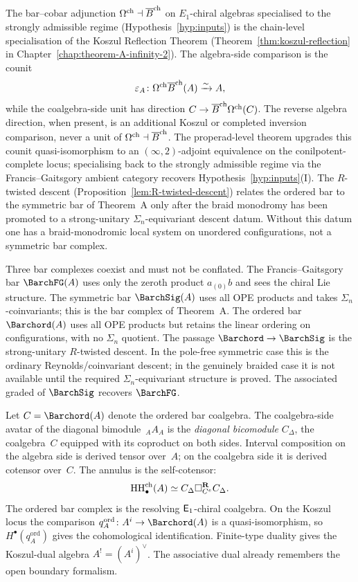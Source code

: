 \begin{remark}
\label{rem:ord-assoc-koszul-reflection-bridge}
The bar--cobar adjunction $\Omega^{\mathrm{ch}} \dashv \overline{B}^{\mathrm{ch}}$ on
$E_1$-chiral algebras specialised to the strongly admissible
regime (Hypothesis~\ref{hyp:inputs}) is the chain-level
specialisation of the Koszul Reflection Theorem
(Theorem~\ref{thm:koszul-reflection} in
Chapter~\ref{chap:theorem-A-infinity-2}). The algebra-side
comparison is the counit
\[
\varepsilon_A\colon \Omega^{\mathrm{ch}}\overline{B}^{\mathrm{ch}}(A)\xrightarrow{\sim} A,
\]
while the coalgebra-side unit has direction
$C\to \overline{B}^{\mathrm{ch}}\Omega^{\mathrm{ch}}(C)$. The reverse algebra direction, when present,
is an additional Koszul or completed inversion comparison, never a
unit of $\Omega^{\mathrm{ch}}\dashv\overline{B}^{\mathrm{ch}}$. The properad-level theorem upgrades
this counit quasi-isomorphism to an $(\infty,2)$-adjoint equivalence
on the conilpotent-complete locus; specialising back to the strongly
admissible regime via the Francis--Gaitsgory ambient category
recovers Hypothesis~\ref{hyp:inputs}(I).
The $R$-twisted descent
(Proposition~\ref{lem:R-twisted-descent}) relates the ordered
bar to the symmetric bar of Theorem~A only after the braid
monodromy has been promoted to a strong-unitary
$\Sigma_n$-equivariant descent datum. Without this datum one has a
braid-monodromic local system on unordered configurations, not a
symmetric bar complex.
\end{remark}

Three bar complexes coexist and must not be conflated.
The Francis--Gaitsgory bar $\BarchFG(A)$ uses only the zeroth
product $a_{(0)}b$ and sees the chiral Lie structure.
The symmetric bar $\BarchSig(A)$ uses all OPE products and takes
$\Sigma_n$-coinvariants; this is the bar complex of Theorem~A.
The ordered bar $\Barchord(A)$ uses all OPE products but retains
the linear ordering on configurations, with no $\Sigma_n$ quotient.
The passage $\Barchord\to \BarchSig$ is the strong-unitary
$R$-twisted descent. In the pole-free symmetric case this is the
ordinary Reynolds/coinvariant descent; in the genuinely braided case it
is not available until the required $\Sigma_n$-equivariant structure is
proved. The associated graded of $\BarchSig$ recovers $\BarchFG$.

Let $C = \Barchord(A)$ denote the ordered bar coalgebra.
The coalgebra-side avatar of the diagonal bimodule~${}_A A_A$
is the \emph{diagonal bicomodule} $C_\Delta$, the coalgebra~$C$
equipped with its coproduct on both sides.
Interval composition on the algebra side is derived tensor over~$A$;
on the coalgebra side it is derived cotensor over~$C$.
The annulus is the self-cotensor:
\[
\operatorname{HH}^{\mathrm{ch}}_\bullet(A)\simeq C_\Delta \square_{C^e}^{\mathbf R} C_\Delta.
\]
The ordered bar complex is the resolving $\mathsf{E}_1$-chiral coalgebra.
On the Koszul locus the comparison
$q_A^{\mathrm{ord}}\colon A^i\to\Barchord(A)$ is a
quasi-isomorphism, so $H^\bullet(q_A^{\mathrm{ord}})$ gives the
cohomological identification.  Finite-type duality gives the
Koszul-dual algebra $A^!=(A^i)^\vee$.
The associative dual already remembers the open boundary formalism.

